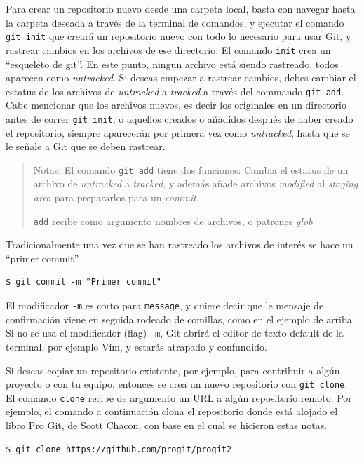 \documentclass[spanish, 12pt, a4paper]{article}
\begin{document}
Para crear un repositorio nuevo desde una carpeta local, basta con
navegar hasta la carpeta deseada a través de la terminal de comandos, y
ejecutar el comando \texttt{git\ init} que creará un repositorio nuevo
con todo lo necesario para usar Git, y rastrear cambios en los archivos
de ese directorio. El comando \texttt{init} crea un ``esqueleto de
git''. En este punto, ningun archivo está siendo rastreado, todos
aparecen como \emph{untracked}. Si deseas empezar a rastrear cambios,
debes cambiar el estatus de los archivos de \emph{untracked} a
\emph{tracked} a través del commando \texttt{git\ add}. Cabe mencionar
que los archivos nuevos, es decir los originales en un directorio antes
de correr \texttt{git\ init}, o aquellos creados o añadidos después de
haber creado el repositorio, siempre aparecerán por primera vez como
\emph{untracked}, hasta que se le señale a Git que se deben rastrear.

\begin{quote}
Notas: El comando \texttt{git add} tiene dos funciones: Cambia el
estatus de un archivo de \emph{untracked} a \emph{tracked}, y además
añade archivos \emph{modified} al \emph{staging area} para prepararlos
para un \emph{commit}.

\texttt{add} recibe como argumento nombres de archivos, o patrones
\emph{glob}.
\end{quote}

Tradicionalmente una vez que se han rastreado los archivos de interés se
hace un ``primer commit''.

\begin{lstlisting}
$ git commit -m "Primer commit"
\end{lstlisting}

El modificador \texttt{-m} es corto para \texttt{message}, y quiere
decir que le mensaje de confirmación viene en seguida rodeado de
comillas, como en el ejemplo de arriba. Si no se usa el modificador
(flag) \texttt{-m}, Git abrirá el editor de texto default de la
terminal, por ejemplo Vim, y estarás atrapado y confundido.

Si deseas copiar un repositorio existente, por ejemplo, para contribuir
a algún proyecto o con tu equipo, entonces se crea un nuevo repositorio
con \texttt{git\ clone}. El comando \texttt{clone} recibe de argumento
un URL a algún repositorio remoto. Por ejemplo, el comando a
continuación clona el repositorio donde está alojado el libro Pro Git,
de Scott Chacon, con base en el cual se hicieron estas notas.

\begin{lstlisting}
$ git clone https://github.com/progit/progit2
\end{lstlisting}
\end{document}
